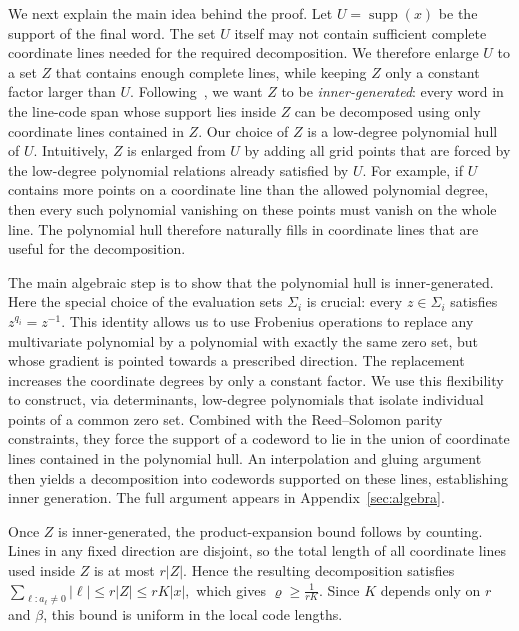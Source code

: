 \documentclass[11pt,letterpaper]{article}
\renewcommand{\le}{\leqslant}
\renewcommand{\ge}{\geqslant}
\theoremstyle{definition}
\theoremstyle{remark}
\newcommand{\supp}{\operatorname{supp}}
\begin{document}
    We next explain the main idea behind the proof. Let $U=\supp(x)$ be the support of the final word. The set $U$ itself may not contain sufficient complete coordinate lines needed for the required decomposition. We therefore enlarge $U$ to a set $Z$ that contains enough complete lines, while keeping $Z$ only a constant factor larger than $U$. Following~\cite{KalachevPanteleev2025}, we want $Z$ to be \emph{inner-generated}: every word in the line-code span whose support lies inside $Z$ can be decomposed using only coordinate lines contained in $Z$. Our choice of $Z$ is a low-degree polynomial hull of $U$. Intuitively, $Z$ is enlarged from $U$ by adding all grid points that are forced by the low-degree polynomial relations already satisfied by $U$. For example, if $U$ contains more points on a coordinate line than the allowed polynomial degree, then every such polynomial vanishing on these points must vanish on the whole line. The polynomial hull therefore naturally fills in coordinate lines that are useful for the decomposition.

    The main algebraic step is to show that the polynomial hull is inner-generated. Here the special choice of the evaluation sets $\Sigma_i$ is crucial: every $z\in\Sigma_i$ satisfies $z^{q_i}=z^{-1}$. This identity allows us to use Frobenius operations to replace any multivariate polynomial by a polynomial with exactly the same zero set, but whose gradient is pointed towards a prescribed direction. The replacement increases the coordinate degrees by only a constant factor. We use this flexibility to construct, via determinants, low-degree polynomials that isolate individual points of a common zero set. Combined with the Reed--Solomon parity constraints, they force the support of a codeword to lie in the union of coordinate lines contained in the polynomial hull. An interpolation and gluing argument then yields a decomposition into codewords supported on these lines, establishing inner generation. The full argument appears in Appendix~\ref{sec:algebra}.

    Once $Z$ is inner-generated, the product-expansion bound follows by counting. Lines in any fixed direction are disjoint, so the total length of all coordinate lines used inside $Z$ is at most $r|Z|$. Hence the resulting decomposition satisfies $\sum_{\ell:a_\ell\neq0}|\ell|\le r|Z|\le rK|x|,$ which gives $\varrho\ge \frac{1}{rK}.$ Since $K$ depends only on $r$ and $\beta$, this bound is uniform in the local code lengths.
    
\end{document}
